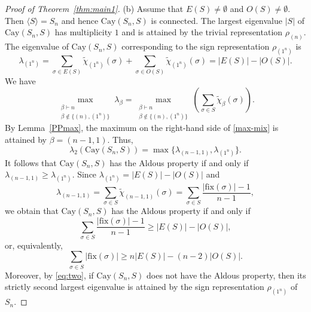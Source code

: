\documentclass[12pt, a4paper]{article}
\def\fix{\mathrm{fix}}
\theoremstyle{definition}
\begin{document}
\begin{proof}[Proof of Theorem~\ref{thm:main1}]
(b) Assume that $E(S)\ne\emptyset$ and $O(S)\ne\emptyset$. Then $\langle S\rangle=S_n$ and hence $\mathrm{Cay}(S_n, S)$ is connected. The largest eigenvalue $|S|$ of $\mathrm{Cay}(S_n,S)$ has multiplicity $1$ and is attained by the trivial representation $\rho_{(n)}$. The eigenvalue of $\mathrm{Cay}(S_n,S)$ corresponding to the sign representation $\rho_{(1^n)}$ is
\begin{equation}
\label{eq:sign}
\lambda_{(1^n)}
=
\sum_{\sigma\in E(S)}\tilde{\chi}_{(1^n)}(\sigma)
+
\sum_{\sigma\in O(S)}\tilde{\chi}_{(1^n)}(\sigma)
=
|E(S)|-|O(S)|.
\end{equation}
We have
\begin{equation}\label{max-mix}
\max_{\substack{\beta\vdash n\\ \beta\notin\{(n),(1^n)\}}}\lambda_\beta
=
\max_{\substack{\beta\vdash n\\ \beta\notin\{(n),(1^n)\}}}
\left(
\sum_{\sigma \in S} \tilde{\chi}_\beta(\sigma)
\right).
\end{equation}
By Lemma~\ref{PPmax}, the maximum on the right-hand side of \eqref{max-mix} is attained by $\beta=(n-1,1)$. Thus,
\begin{equation}
\label{eq:two}
\lambda_2(\mathrm{Cay}(S_n, S))=\max\{\lambda_{(n-1,1)},\lambda_{(1^n)}\}.
\end{equation}
It follows that $\mathrm{Cay}(S_n, S)$ has the Aldous property if and only if $\lambda_{(n-1,1)} \geq \lambda_{(1^n)}$. Since $\lambda_{(1^n)}
= |E(S)|-|O(S)|$ and 
$$
\lambda_{(n-1,1)}
=
\sum_{\sigma\in S}\tilde{\chi}_{(n-1,1)}(\sigma)
=
\sum_{\sigma\in S}\frac{|\fix(\sigma)|-1}{n-1},
$$
we obtain that $\mathrm{Cay}(S_n, S)$ has the Aldous property if and only if $$
\sum_{\sigma\in S}\frac{|\fix(\sigma)|-1}{n-1} \ge |E(S)| -|O(S)|,
$$
or, equivalently,
$$
\sum_{\sigma\in S} |\fix(\sigma)| \ge n|E(S)|-(n-2)|O(S)|.
$$
Moreover, by \eqref{eq:two}, if $\mathrm{Cay}(S_n, S)$ does not have the Aldous property, then its strictly second largest eigenvalue is attained by the sign representation $\rho_{(1^n)}$ of $S_n$. 
\end{proof}
\end{document}
